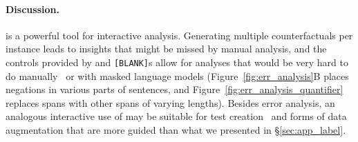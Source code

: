 \paragraph{Discussion.} 
\sysname{} is a powerful tool for interactive analysis.
Generating multiple counterfactuals per instance leads to insights that might be missed by manual analysis, and the controls provided by \tagstrs and \texttt{[BLANK]}s allow for analyses that would be very hard to do manually~\cite{wu2019errudite} or with masked language models (\eg Figure~\ref{fig:err_analysis}B places negations in various parts of sentences, and Figure~\ref{fig:err_analysis_quantifier} replaces spans with other spans of varying lengths). Besides error analysis, an analogous interactive use of \sysname{} may be suitable for test creation~\cite{checklist:acl20} and forms of data augmentation that are more guided than what we presented in \S\ref{sec:app_label}.





